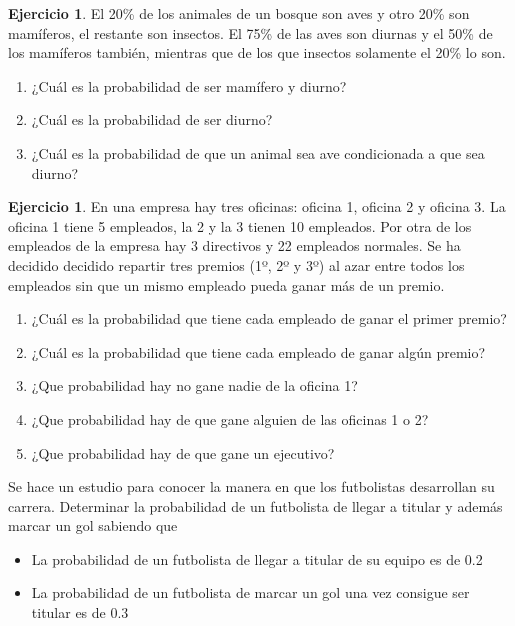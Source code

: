 \documentclass[]{article}
\providecommand{\tightlist}{%
  \setlength{\itemsep}{0pt}\setlength{\parskip}{0pt}}
\theoremstyle{plain}
\theoremstyle{definition}
\newtheorem{exercise}[theorem]{Ejercicio}
\theoremstyle{definition} %
\begin{document}
  
  \begin{exercise}

  El 20\% de los animales de un bosque son aves y otro 20\% son
  mamíferos, el restante son insectos. El 75\% de las aves son diurnas y
  el 50\% de los mamíferos también, mientras que de los que insectos
  solamente el 20\% lo son.

  \begin{enumerate}
  \def\labelenumii{\arabic{enumii}.}
  \tightlist
  \item
    ¿Cuál es la probabilidad de ser mamífero y diurno?
  \item
    ¿Cuál es la probabilidad de ser diurno?
  \item
    ¿Cuál es la probabilidad de que un animal sea ave condicionada a que
    sea diurno?
  \end{enumerate}
\end{exercise}

  
  \begin{exercise}

  En una empresa hay tres oficinas: oficina 1, oficina 2 y oficina 3. La
  oficina 1 tiene 5 empleados, la 2 y la 3 tienen 10 empleados. Por otra
  de los empleados de la empresa hay 3 directivos y 22 empleados
  normales. Se ha decidido decidido repartir tres premios (1º, 2º y 3º)
  al azar entre todos los empleados sin que un mismo empleado pueda
  ganar más de un premio.

  \begin{enumerate}
  \def\labelenumii{\arabic{enumii}.}
  \tightlist
  \item
    ¿Cuál es la probabilidad que tiene cada empleado de ganar el primer
    premio?
  \item
    ¿Cuál es la probabilidad que tiene cada empleado de ganar algún
    premio?
  \item
    ¿Que probabilidad hay no gane nadie de la oficina 1?
  \item
    ¿Que probabilidad hay de que gane alguien de las oficinas 1 o 2?
  \item
    ¿Que probabilidad hay de que gane un ejecutivo?
  \end{enumerate}
\item
  Se hace un estudio para conocer la manera en que los futbolistas
  desarrollan su carrera. Determinar la probabilidad de un futbolista de
  llegar a titular y además marcar un gol sabiendo que

  \begin{itemize}
  \tightlist
  \item
    La probabilidad de un futbolista de llegar a titular de su equipo es
    de 0.2
  \item
    La probabilidad de un futbolista de marcar un gol una vez consigue
    ser titular es de 0.3
  \end{itemize}
\end{exercise}
\end{document}
